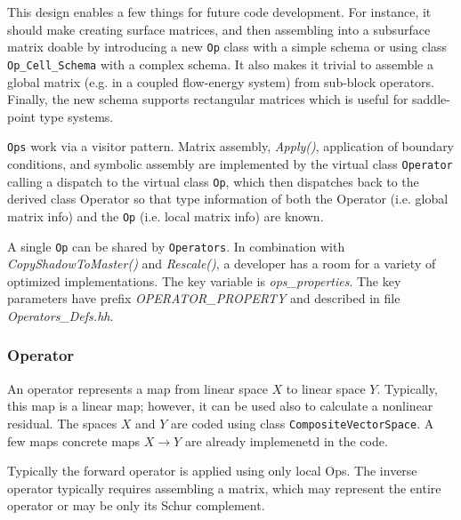 This design enables a few things for future code development.
For instance, it should make creating surface matrices, and then assembling into a 
subsurface matrix doable by introducing a new {\tt Op} class with a simple schema
or using class {\tt Op\_Cell\_Schema} with a complex schema. 
It also makes it trivial to assemble a global matrix (e.g. in a coupled flow-energy system)
from sub-block operators.
Finally, the new schema supports rectangular matrices which is useful for saddle-point 
type systems.

{\tt Ops} work via a visitor pattern.
Matrix assembly, {\it Apply()}, application of boundary conditions, and symbolic assembly 
are implemented by the virtual class {\tt Operator} calling a dispatch to the 
virtual class {\tt Op}, which then dispatches back to the derived class Operator so that
type information of both the Operator (i.e. global matrix info) and 
the {\tt Op} (i.e. local matrix info) are known.

A single {\tt Op} can be shared by {\tt Operators}. 
In combination with {\it CopyShadowToMaster()} and {\it Rescale()},
a developer has a room for a variety of optimized implementations.
The key variable is {\it ops\_properties}. The key parameters have prefix
{\it OPERATOR\_PROPERTY} and described in file {\it Operators\_Defs.hh}.


\subsubsection{Operator}
An operator represents a map from linear space $X$ to linear space $Y$.
Typically, this map is a linear map; however, it can be used also to calculate
a nonlinear residual. 
The spaces $X$ and $Y$ are coded using class {\tt CompositeVectorSpace}.
A few maps concrete maps $X \to Y$ are already implemenetd in the code.

Typically the forward operator is applied using only local Ops.
The inverse operator typically requires assembling a matrix, which 
may represent the entire operator or may be only its Schur complement.


